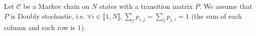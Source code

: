 \documentclass[a4paper,11pt]{exam}
\renewcommand{\binom}{\mbinom}
\newcommand{\Z}{\mathbb{Z}}
\begin{document}
\begin{questions}
%	

\question
Let $\mathcal{C}$ be a Markov chain on $N$ states with a transition matrix $P$.
We assume that $P$ is \textrm{Doubly stochastic}, i.e.
$\forall i \in \llbracket 1, N\rrbracket, \sum_j p_{i,j} = \sum_j p_{j,i} =1 $
(the sum of each column and each row is $1$).


\end{questions}
\end{document}
